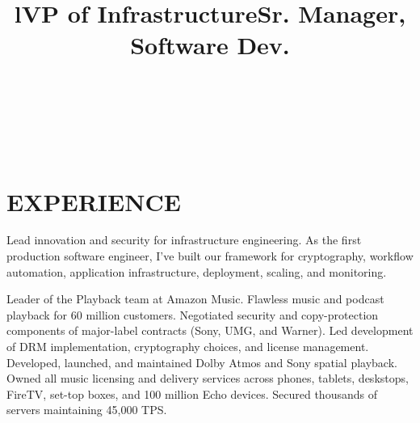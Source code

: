 \documentclass[margin]{res}
\begin{document}
\bigskip

\address{2528 Chilton Way\\ken@hero.net}
\address{Berkeley, CA 94704\\(310) 383-7981}

\begin{resume}

\begin{format}
\title{l}\\
\\
\body\\
\end{format}

\section{EXPERIENCE}

\title{\textbf{VP of Infrastructure}}
\begin{position}
\hspace*{.5cm}Lead innovation and security for infrastructure engineering. As the first production software engineer, I've built our framework for cryptography, workflow automation, application infrastructure, deployment, scaling, and monitoring.
\end{position}
\title{\textbf{Sr. Manager, Software Dev.}}
\begin{position}
\hspace*{.25cm}Leader of the Playback team at Amazon Music. Flawless music and podcast playback for 60 million customers. Negotiated security and copy-protection components of major-label contracts (Sony, UMG, and Warner). Led development of DRM implementation, cryptography choices, and license management. Developed, launched, and maintained Dolby Atmos and Sony spatial playback. Owned all music licensing and delivery services across phones, tablets, deskstops, FireTV, set-top boxes, and 100 million Echo devices. Secured thousands of servers maintaining 45,000 TPS.
\end{position}


\end{resume}
\end{document}
